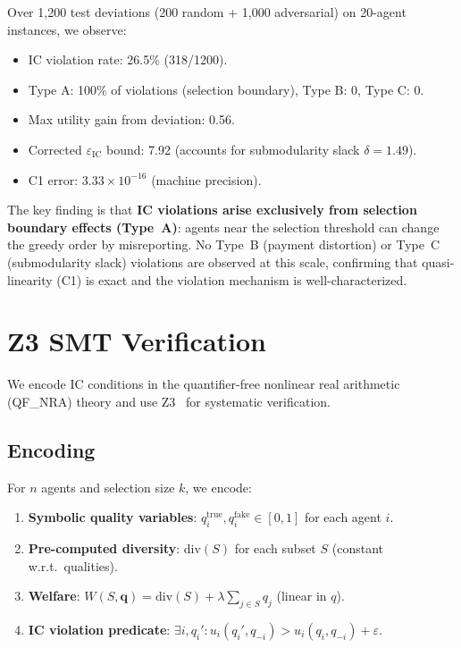 \documentclass[10pt]{article}
\begin{document}
Over 1{,}200 test deviations (200 random + 1{,}000 adversarial) on 20-agent instances, we observe:
\begin{itemize}[leftmargin=*,itemsep=1pt]
\item IC violation rate: 26.5\% (318/1200).
\item Type A: 100\% of violations (selection boundary), Type B: 0, Type C: 0.
\item Max utility gain from deviation: 0.56.
\item Corrected $\varepsilon_{\mathrm{IC}}$ bound: 7.92 (accounts for submodularity slack $\delta = 1.49$).
\item C1 error: $3.33 \times 10^{-16}$ (machine precision).
\end{itemize}

The key finding is that \textbf{IC violations arise exclusively from selection boundary effects (Type~A)}: agents near the selection threshold can change the greedy order by misreporting.
No Type~B (payment distortion) or Type~C (submodularity slack) violations are observed at this scale, confirming that quasi-linearity (C1) is exact and the violation mechanism is well-characterized.

\section{Z3 SMT Verification}
\label{sec:z3}

We encode IC conditions in the quantifier-free nonlinear real arithmetic (QF\_NRA) theory and use Z3~\citep{demoura2008z3} for systematic verification.

\subsection{Encoding}

For $n$ agents and selection size $k$, we encode:
\begin{enumerate}[leftmargin=*,itemsep=1pt]
\item \textbf{Symbolic quality variables}: $q_i^{\mathrm{true}}, q_i^{\mathrm{fake}} \in [0, 1]$ for each agent $i$.
\item \textbf{Pre-computed diversity}: $\mathrm{div}(S)$ for each subset $S$ (constant w.r.t.\ qualities).
\item \textbf{Welfare}: $W(S, \mathbf{q}) = \mathrm{div}(S) + \lambda \sum_{j \in S} q_j$ (linear in $q$).
\item \textbf{IC violation predicate}: $\exists i, q_i': u_i(q_i', q_{-i}) > u_i(q_i, q_{-i}) + \varepsilon$.
\end{enumerate}
\end{document}
